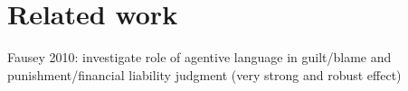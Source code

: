\documentclass[11pt,a4paper]{article}
\newcommand{\ek}[1]{\textcolor{Orange}{[ek: #1]}}
\begin{document}




\section{Related work}



Fausey 2010: investigate role of agentive language in guilt/blame and punishment/financial liability judgment (very strong and robust effect)
\end{document}
